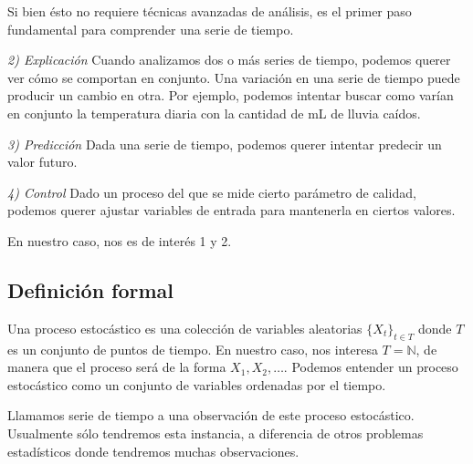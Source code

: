 Si bien ésto no requiere técnicas avanzadas de análisis, es el primer paso fundamental para comprender una serie de tiempo.


\emph{2) Explicación} Cuando analizamos dos o más series de tiempo, podemos querer ver cómo se comportan en conjunto. Una variación en una serie de tiempo puede producir un cambio en otra. Por ejemplo, podemos intentar buscar como varían en conjunto la temperatura diaria con la cantidad de mL de lluvia caídos.

\emph{3) Predicción} Dada una serie de tiempo, podemos querer intentar predecir un valor futuro.

\emph{4) Control} Dado un proceso del que se mide cierto parámetro de calidad, podemos querer ajustar variables de entrada para mantenerla en ciertos valores.

En nuestro caso, nos es de interés 1 y 2.


\subsection*{Definición formal}

Una proceso estocástico es una colección de variables aleatorias $\{X_t \}_{t \in T}$ donde $T$ es un conjunto de puntos de tiempo. En nuestro caso, nos interesa $T = \mathbb{N}$, de manera que el proceso será de la forma $X_1, X_2, \ldots $. Podemos entender un proceso estocástico como un conjunto de variables ordenadas por el tiempo.

Llamamos serie de tiempo a una observación de este proceso estocástico. Usualmente sólo tendremos esta instancia, a diferencia de otros problemas estadísticos donde tendremos muchas observaciones.

